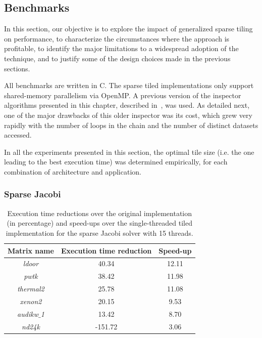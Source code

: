 

\subsection{Benchmarks}
In this section, our objective is to explore the impact of generalized sparse tiling on performance, to characterize the circumstances where the approach is profitable, to identify the major limitations to a widespread adoption of the technique, and to justify some of the design choices made in the previous sections.

All benchmarks are written in C. The sparse tiled implementations only support shared-memory parallelism via OpenMP. A previous version of the inspector algorithms presented in this chapter, described in~\cite{st-paper}, was used. As detailed next, one of the major drawbacks of this older inspector was its cost, which grew very rapidly with the number of loops in the chain and the number of distinct datasets accessed. 

In all the experiments presented in this section, the optimal tile size (i.e. the one leading to the best execution time) was determined empirically, for each combination of architecture and application. 

\subsubsection{Sparse Jacobi}

\begin{table}[t]
\centering
\begin{tabulary}{1.0\columnwidth}{c | c | c}
\hline
Matrix name & Execution time reduction & Speed-up  \\
\hline
{\em ldoor} & 40.34 & 12.11 \\
{\em pwtk} & 38.42 & 11.98 \\
{\em thermal2} & 25.78 & 11.08 \\
{\em xenon2} & 20.15 & 9.53 \\
{\em audikw$\_$1} & 13.42 & 8.70 \\
{\em nd24k} & -151.72 & 3.06 \\
\hline
\end{tabulary}
\caption{Execution time reductions over the original implementation (in percentage) and speed-ups over the single-threaded tiled implementation for the sparse Jacobi solver with 15 threads.}
\label{table:st-jacobi}
\end{table}

